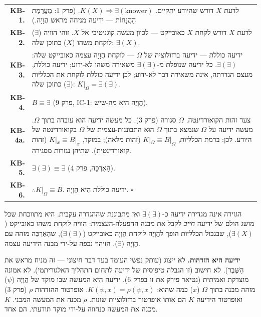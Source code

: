 \documentclass[10pt, openany, oneside]{book}
\renewcommand{\footnotesize}{\fontsize{8.5}{11}\selectfont}
\begin{document}
{\footnotesize
\noindent\begin{tabular}{r p{}}
\textbf{KB-1.} & לדעת $X$ דורש שהיודע יתקיים. $K(X) \Rightarrow \exists(\text{knower})$. (פרק 1: מַעֲרֶמֶת הַהֲנָחוֹת — ידיעה מניחה מראש הֲוָיָה.) \\[0.3em]
\textbf{KB-2.} & לדעת $X$ דורש לקחת $X$ כאובייקט — לכוון מעשה קוגניטיבי אל $X$. זוהי הוויה ($\exists$) לוקחת משהו ($X$) כתוכן שלה: $\exists(X)$. \\[0.3em]
\textbf{KB-3.} & ידיעה כוללת — ידיעה ברזולוציה של $\Omega$ — לוקחת הֲוָיָה עצמה כאובייקט שלה: $\exists(\exists)$. כל ידיעה שנופלת מ-$\exists(\exists)$ משאירה משהו לא-ידוע; ידיעה כוללת, מעצם הגדרתה, אינה משאירה דבר לא-ידוע; לכן ידיעה כוללת לוקחת את הכלליות ($\exists$) כתוכן שלה: $K|_{\Omega} = \exists(\exists)$. \\[0.3em]
\textbf{KB-4.} & $B \equiv \exists$ (פרק 9, IC-1: הֲוָיָה היא מה-שיש). \\[0.3em]
\textbf{KB-4a.} & \textsc{צעד זהות הקואורדינטה.} $\Omega$ סגורה (פרק 3). כל מעשה ידיעה הוא עובדה בתוך $\Omega$. מעשה ידיעה על $\Omega$ שנמצא בתוך $\Omega$ הוּא התבוננות-עצמית של $\Omega$ בקואורדינטה של היודע. לכן: ברמת הכלליות, $K|_\Omega \equiv B|_\Omega$ (זהות מלאה); במוקד, $K|_x \equiv B|_x$ (זהות קואורדינטית). שתיהן נגזרות מסגירה. \\[0.3em]
\textbf{KB-5.} & $\exists(\exists) \equiv \exists$ (הָאַרְכֵּה, פרק 4). \\[0.3em]
\textbf{KB-6.} & $\therefore K|_{\Omega} \equiv B$. ידיעה כוללת הִיא הֲוָיָה. $\square$ \\[0.3em]
\end{tabular}
}

\vspace{0.8em}

\noindent הגזירה אינה מגדירה ידיעה כ-$\exists(\exists)$ ואז מתבוננת שההגדרה עקבית. היא מתווכחת שכל מושג הולם של ידיעה \textit{חייב} לקבל את מבנה ההפעלה-העצמית: הוויה לוקחת משהו כאובייקט ($\exists(X)$), שבגבול הכלליות הופך להֲוָיָה לוקחת הֲוָיָה כאובייקט ($\exists(\exists)$), שהָאַרְכֵּה מזהה עם הֲוָיָה ($\exists$). הזיהוי נכפה על-ידי מבנה הידיעה עצמה.

\textbf{ידיעה היא הזדהות.} לא ייצוג (עותק נפשי העומד בעד דבר חיצוני — זה מניח מראש את הַשֶּׁבֶר). לא חישוב (זו הגבלה טיפוסית של ידיעה לתחום התהליך האלגוריתמי). לא אמונה מוצדקת ואמיתית (גטיאר פירק את זו בפרק 6). ידיעה הִיא המעשה שבו מוקד של הֲוָיָה ($\psi$) מזהה מבנה בתוך $\Omega$ ($x$) כמה שהוא: $K(\psi, x) = \rho(\psi, x)$. אופרטור ההזדהות $\rho$ (פרק 3) ואופרטור הידיעה $K$ הם אותו אופרטור ברזולוציות שונות. $\rho$ מכנה את המעשה המבני. $K$ מכנה את המעשה כנחווה על-ידי מוקד תודעתי. הם אחד.
\end{document}
